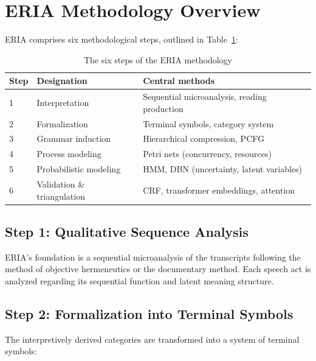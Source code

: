 \documentclass[12pt,a4paper]{article}
\begin{document}
\section{ERIA Methodology Overview}

ERIA comprises six methodological steps, outlined in Table~\ref{tab:schritte}:

\begin{table}[H]
\centering
\caption{The six steps of the ERIA methodology}
\label{tab:schritte}
\begin{tabular}{@{} p{2.5cm} p{3cm} p{7cm} @{}}
\toprule
\textbf{Step} & \textbf{Designation} & \textbf{Central methods} \\
\midrule
1 & Interpretation & Sequential microanalysis, reading production \\
2 & Formalization & Terminal symbols, category system \\
3 & Grammar induction & Hierarchical compression, PCFG \\
4 & Process modeling & Petri nets (concurrency, resources) \\
5 & Probabilistic modeling & HMM, DBN (uncertainty, latent variables) \\
6 & Validation \& triangulation & CRF, transformer embeddings, attention \\
\bottomrule
\end{tabular}
\end{table}

\subsection{Step 1: Qualitative Sequence Analysis}

ERIA's foundation is a sequential microanalysis of the transcripts following the method of objective hermeneutics or the documentary method. Each speech act is analyzed regarding its sequential function and latent meaning structure.

\subsection{Step 2: Formalization into Terminal Symbols}

The interpretively derived categories are transformed into a system of terminal symbols:
\end{document}
